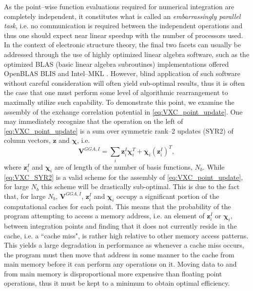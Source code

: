 As the point--wise
function evaluations required for numerical integration are completely independent, it constitutes what is called an
\emph{embarrassingly parallel task}, i.e. no communication is required between the independent operations and thus
one should expect near linear speedup with the number of processors used. 
In the context of electronic structure theory,
the final two facets can usually be addressed through the use of highly optimized linear algebra software, such as
the optimized BLAS (basic linear algebra subroutines) implementations offered OpenBLAS \cite{Qing13_ICHPC25,Yunquan12_PDS684} BLIS \cite{vanDeGeijn15_TOMS14} and Intel--MKL \cite{MKL}. 
However, blind application of such software without careful consideration will often yield sub-optimal results,
thus it is often the case that one must perform some level of algorithmic rearrangement to maximally utilize
such capability. 
To demonstrate this point, we examine the assembly of the exchange correlation potential
in \cref{eq:VXC_point_update}.
One may immediately recognize that the operation on the left of \cref{eq:VXC_point_update}
is a sum over symmetric rank--2 updates (SYR2) of column vectors, $\mathbf{z}$ and $\boldsymbol{\chi}$,
i.e.
\begin{equation}
\label{eq:VXC_SYR2}
\mathbf{V}^{GGA,I} = \sum_i \mathbf{z}^I_i \boldsymbol{\chi}_i^T + \boldsymbol{\chi}_i \left(\mathbf{z}^I_i\right)^T ,
\end{equation}
where $\mathbf{z}_i^I$ and $\boldsymbol{\chi}_i$ are of length of the number of basis functions, $N_b$. While \cref{eq:VXC_SYR2}
is a valid scheme for the assembly of \cref{eq:VXC_point_update}, for large $N_b$ this scheme will be drastically sub-optimal.
This is due to the fact that, for large $N_b$, $\mathbf{V}^{GGA,I}$, $\mathbf{z}_i^I$ and $\boldsymbol{\chi}_i$ occupy a significant
portion of the computational caches for each point. This means that the probability of the program attempting to access
a memory address, i.e. an element of $\mathbf{z}_i^I$ or $\boldsymbol{\chi}_i$, between integration points and finding that it does not
currently reside in the cache, i.e. a ``cache miss", is rather high relative to other memory access patterns. This yields a
large degradation in performance as whenever a cache miss occurs, the program must then move that address in some manner to
the cache from main memory before it can perform any operations on it. Moving data to and from main memory is disproportional
more expensive than floating point operations, thus it must be kept to a minimum to obtain
optimal efficiency.


